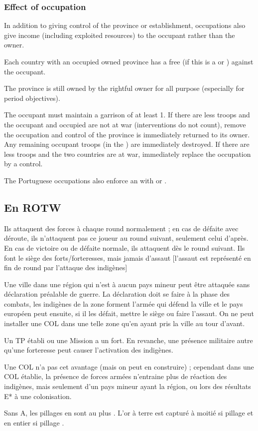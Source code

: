 \subsubsection{Effect of occupation}
\aparag In addition to giving control of the province or
establishment, occupations also give income (including exploited
resources) to the occupant rather than the owner.

\aparag Each country with an occupied owned province has a free \CB
(\OCB if this is a \COL or \TP) against the occupant.

\aparag The province is still owned by the rightful owner for all \VPs
purpose (especially for period objectives).

\aparag The occupant must maintain a garrison of at least 1\LD.
\bparag If there are less troops and the occupant and occupied are not
at war (interventions do not count), remove the occupation and control
of the province is immediately returned to its owner. Any remaining
occupant troops (\de in the \ROTW) are immediately destroyed.
\bparag If there are less troops and the two countries are at war,
immediately replace the occupation by a control.

\aparag The Portuguese occupations also enforce an \dipAT with
\paysOman or \paysAden.

\subsection{En ROTW}

Ils attaquent des forces à chaque round normalement ; en cas
de défaite avec déroute, ils n'attaquent pas ce joueur au
round suivant, seulement celui d'après. En cas de victoire
ou de défaite normale, ils attaquent dès le round suivant.
Ils font le siège des forts/forteresses, mais jamais d'assaut
[l'assaut est représenté en fin de round par l'attaque des indigènes]

\aparag Une ville dans une région qui n'est à aucun pays mineur peut
être attaquée sans déclaration préalable de guerre. La déclaration
doit se faire à la phase des combats, les indigènes de la zone
forment l'armée qui défend la ville et le pays européen peut
ensuite, si il les défait, mettre le siège ou faire l'assaut.
On ne peut installer une COL dans une telle zone qu'en ayant
pris la ville au tour d'avant.

\aparag Un TP établi ou une Mission a un fort. En revanche, une présence militaire
autre qu'une forteresse peut causer l'activation des indigènes.

\aparag Une COL n'a pas cet avantage (mais on peut en construire) ;
cependant dans une COL établie, la présence de forces armées
n'entraine plus de réaction des indigènes, mais
seulement d'un pays mineur ayant la région, ou lors des
résultats E* à une colonisation.

\aparag[Pillages]
\bparag Sans A, les pillages en \ROTW sont au plus \Facemoins.
\bparag L'or à terre est capturé à moitié si pillage \Facemoins et en
entier si pillage \Faceplus.

